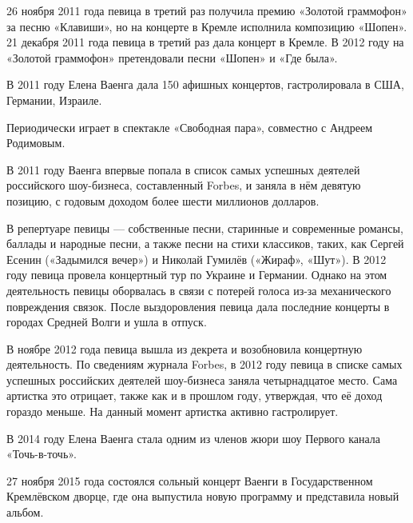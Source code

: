 26 ноября 2011 года певица в третий раз получила премию «Золотой граммофон» за песню «Клавиши», но на концерте в Кремле исполнила композицию «Шопен». 21 декабря 2011 года певица в третий раз дала концерт в Кремле. В 2012 году на «Золотой граммофон» претендовали песни «Шопен» и «Где была».

В 2011 году Елена Ваенга дала 150 афишных концертов, гастролировала в США, Германии, Израиле.

Периодически играет в спектакле «Свободная пара», совместно с Андреем Родимовым.

В 2011 году Ваенга впервые попала в список самых успешных деятелей российского шоу-бизнеса, составленный Forbes, и заняла в нём девятую позицию, с годовым доходом более шести миллионов долларов.

В репертуаре певицы --- собственные песни, старинные и современные романсы, баллады и народные песни, а также песни на стихи классиков, таких, как Сергей Есенин («Задымился вечер») и Николай Гумилёв («Жираф», «Шут»). В 2012 году певица провела концертный тур по Украине и Германии. Однако на этом деятельность певицы оборвалась в связи с потерей голоса из-за механического повреждения связок. После выздоровления певица дала последние концерты в городах Средней Волги и ушла в отпуск.

В ноябре 2012 года певица вышла из декрета и возобновила концертную деятельность. По сведениям журнала Forbes, в 2012 году певица в списке самых успешных российских деятелей шоу-бизнеса заняла четырнадцатое место. Сама артистка это отрицает, также как и в прошлом году, утверждая, что её доход гораздо меньше. На данный момент артистка активно гастролирует.

В 2014 году Елена Ваенга стала одним из членов жюри шоу Первого канала «Точь-в-точь».

27 ноября 2015 года состоялся сольный концерт Ваенги в Государственном Кремлёвском дворце, где она выпустила новую программу и представила новый альбом.
